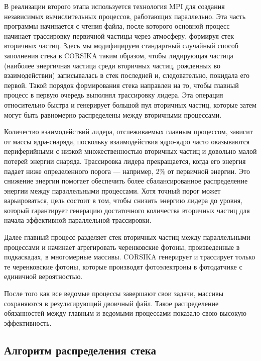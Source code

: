 \documentclass[aps,preprint,showpacs,aps,amsmath,showkeys,nobibnotes,nofootinbib,footnotes,superscriptaddress]{revtex4-2}
\begin{document}
В реализации второго этапа используется технология MPI для создания независимых вычислительных процессов, работающих параллельно. Эта часть программы начинается с чтения файла, после которого основной процесс начинает трассировку первичной частицы через атмосферу, формируя стек вторичных частиц. Здесь мы модифицируем стандартный случайный способ заполнения стека в CORSIKA таким образом, чтобы лидирующая частица (наиболее энергичная частица среди вторичных частиц, рожденных во взаимодействии) записывалась в стек последней и, следовательно, покидала его первой. Такой порядок формирования стека направлен на то, чтобы главный процесс в первую очередь выполнял трассировку лидера. Эта операция относительно быстра и генерирует большой пул вторичных частиц, которые затем могут быть равномерно распределены между вторичными процессами.

Количество взаимодействий лидера, отслеживаемых главным процессом, зависит от массы ядра-снаряда, поскольку взаимодействия ядро-ядро часто оказываются периферийными с низкой множественностью вторичных частиц и довольно малой потерей энергии снаряда. Трассировка лидера прекращается, когда его энергия падает ниже определенного порога — например, 2\% от первичной энергии. Это снижение энергии помогает обеспечить более сбалансированное распределение энергии между параллельными процессами. Хотя точный порог может варьироваться, цель состоит в том, чтобы снизить энергию лидера до уровня, который гарантирует генерацию достаточного количества вторичных частиц для начала эффективной параллельной трассировки.

Далее главный процесс разделяет стек вторичных частиц между параллельными процессами и начинает агрегировать черенковские фотоны, произведенные в подкаскадах, в многомерные массивы. CORSIKA генерирует и трассирует только те черенковские фотоны, которые производят фотоэлектроны в фотодатчике с единичной вероятностью. 

После того как все ведомые процессы завершают свои задачи, массивы сохраняются в результирующий двоичный файл. Такое распределение обязанностей между главным и ведомыми процессами показало свою высокую эффективность.


\subsection{Алгоритм распределения стека}
\end{document}
